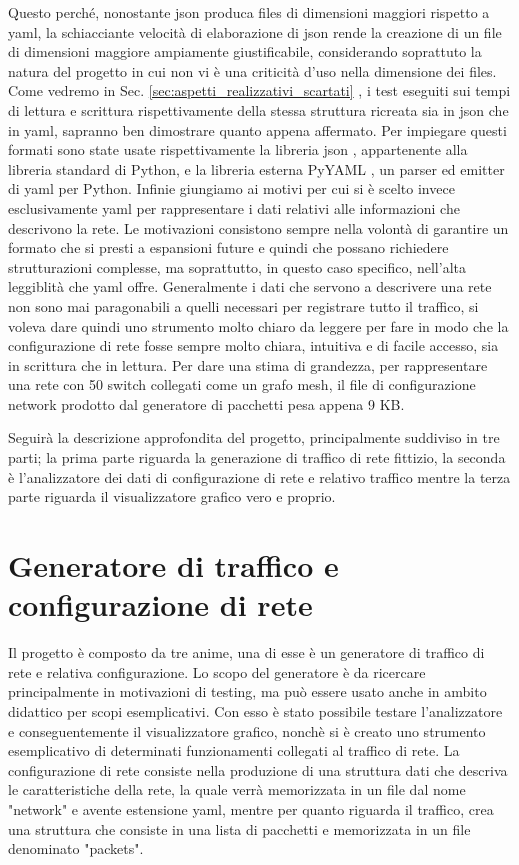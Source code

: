 \documentclass[binding=0.6cm]{sapthesis}
\begin{document}
Questo perché, nonostante json produca files di dimensioni maggiori rispetto a yaml, la schiacciante velocità di elaborazione di json rende la creazione di
un file di dimensioni maggiore ampiamente giustificabile, considerando soprattuto la natura del progetto in cui non vi è una
criticità d'uso nella dimensione dei files. Come vedremo in Sec. \ref{sec:aspetti_realizzativi_scartati} , i test eseguiti sui tempi di lettura e scrittura rispettivamente della stessa struttura
ricreata sia in json che in yaml, sapranno ben
dimostrare quanto appena affermato. Per impiegare questi formati sono state usate rispettivamente la libreria json \cite{PythonJSONLibrary}, appartenente alla libreria standard di Python, e la
libreria esterna PyYAML \cite{PyYAMLDocumentation}, un parser ed emitter di yaml per Python.
Infinie giungiamo ai motivi per cui si è scelto invece esclusivamente yaml per rappresentare i 
dati relativi alle informazioni che descrivono la rete. Le motivazioni consistono sempre nella volontà
di garantire un formato che si presti a espansioni future e quindi che possano richiedere strutturazioni complesse, ma soprattutto,
in questo caso specifico, nell'alta leggiblità che yaml offre. Generalmente i dati che servono a descrivere una rete non sono mai paragonabili a quelli
necessari per registrare tutto il traffico, si voleva dare quindi uno strumento molto chiaro da leggere per fare in modo che la configurazione di rete
fosse sempre molto chiara, intuitiva e di facile accesso, sia in scrittura che in lettura. 
Per dare una stima di grandezza, per rappresentare una rete con 50 switch collegati come un grafo mesh, il file
di configurazione network prodotto dal generatore di pacchetti pesa appena 9 KB.


Seguirà la descrizione approfondita del progetto, principalmente suddiviso in tre parti; la prima 
parte riguarda la generazione di traffico di rete fittizio, la seconda è l'analizzatore dei dati di configurazione di rete e relativo traffico mentre la terza
parte riguarda il visualizzatore grafico vero e proprio.

\chapter{Generatore di traffico e configurazione di rete}

Il progetto è composto da tre anime, una di esse è un generatore di traffico di rete e relativa configurazione.
Lo scopo del generatore è da ricercare principalmente in motivazioni di testing, ma può essere
 usato anche in ambito didattico per scopi
esemplicativi. Con esso è stato possibile testare l'analizzatore e conseguentemente il visualizzatore grafico, nonchè si è creato 
uno strumento esemplicativo di determinati funzionamenti collegati al traffico di rete.
La configurazione di rete consiste nella produzione di una struttura dati che descriva 
le caratteristiche della rete, la quale
verrà memorizzata in un file dal nome "network" e avente estensione yaml, mentre per quanto
riguarda il traffico, crea una struttura che consiste in una lista di pacchetti e memorizzata in un file denominato "packets".
\end{document}
